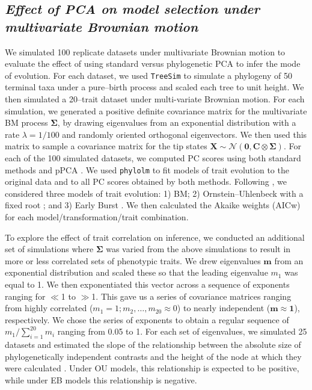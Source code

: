 \documentclass[a4paper,12pt]{article}
\begin{document}
\subsection{\emph{Effect of PCA on model selection under multivariate Brownian motion}}
We simulated 100 replicate datasets under multivariate Brownian motion to evaluate the effect of using standard versus phylogenetic PCA to infer the mode of evolution. For each dataset, we used \texttt{TreeSim} \citep{treesim} to simulate a phylogeny of 50 terminal taxa under a pure--birth process and scaled each tree to unit height. We then simulated a 20--trait dataset under multi-variate Brownian motion. For each simulation, we generated a positive definite covariance matrix for the multivariate BM process $\mathbf{\Sigma}$, by drawing eigenvalues from an exponential distribution with a rate $\lambda = \text{1/100}$ and randomly oriented orthogonal eigenvectors. We then used this matrix to sample a covariance matrix for the tip states 
$\mathbf{X}\sim \mathcal{N}(\mathbf{0}, \mathbf{C} \otimes \mathbf{\Sigma})$.
For each of the 100 simulated datasets, we computed PC scores using both standard methods and pPCA \citep[using the \texttt{phytools} package;][]{phytools}. We used \texttt{phylolm} \citep{HoandAne2014} to fit models of trait evolution to the original data and to all PC scores obtained by both methods. Following \citet{Harmon2010}, we considered three models of trait evolution: 1) BM; 2) Ornstein--Uhlenbeck with a fixed root \citep[OU:][]{ Hansen1997}; and 3) Early Burst \citep[EB:][]{Blomberg2003, Harmon2010}. We then calculated the Akaike weights (AICw) for each model/transformation/trait combination.

To explore the effect of trait correlation on inference, we conducted an additional set of simulations where $\mathbf{\Sigma}$ was varied from the above simulations to result in more or less correlated sets of phenotypic traits. We drew eigenvalues $\mathbf{m}$ from an exponential distribution and scaled these so that the leading eigenvalue $m_{\text{1}}$ was equal to 1. We then exponentiated this vector across a sequence of exponents ranging for $\ll$1 to $\gg$1. This gave us a series of covariance matrices ranging from highly correlated ($m_{\text{1}} = \text{1}; m_{\text{2}}, \ldots, m_{\text{20}} \approx \text{0}$) to nearly independent ($\mathbf{m} \approx \textbf{1}$), respectively. We chose the series of exponents to obtain a regular sequence of $m_{\text{1}} / \sum_{i=\text{1}}^{\text{20}} m_i$ ranging from 0.05 to 1. For each set of eigenvalues, we simulated 25 datasets and estimated the slope of the relationship between the absolute size of phylogenetically independent contrasts \citep{Felsenstein1985} and the height of the node at which they were calculated \citep[i.e., the ``node height test'' of][]{FreckletonHarvey2006}. Under OU models, this relationship is expected to be positive, while under EB models this relationship is negative.
\end{document}
